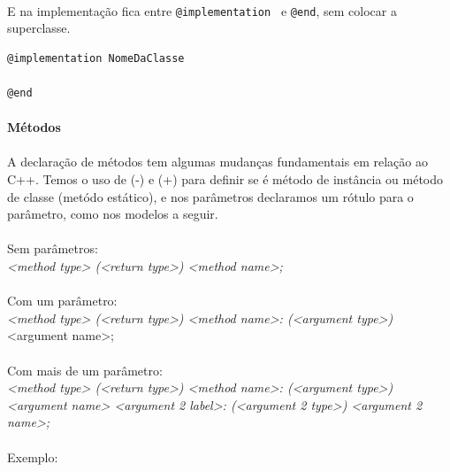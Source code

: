 \documentclass[a4paper,12pt,brazil,doubleside]{book}
\begin{document}
\paragraph{}E na implementação fica entre \texttt{@implementation
} e \texttt{@end}, sem colocar a superclasse.

\begin{listing}
\begin{verbatim}
@implementation NomeDaClasse

@end
\end{verbatim}
\end{listing}

\paragraph{}\textbf{Métodos}

\paragraph{}A declaração de métodos tem algumas mudanças fundamentais em relação ao C++. Temos o uso de (-) e (+) para definir se é método de instância ou método de classe (metódo estático), e nos parâmetros declaramos um rótulo para o parâmetro, como nos modelos a seguir.

\paragraph{}Sem parâmetros:\\
\emph{<method type> (<return type>) <method name>;}

\paragraph{}Com um parâmetro:\\
\emph{<method type> (<return type>) <method name>: (<argument type>)} <argument name>;

\paragraph{}Com mais de um parâmetro:\\
\emph{<method type> (<return type>) <method name>: (<argument type>) <argument name> <argument 2 label>: (<argument 2 type>) <argument 2 name>;}

\paragraph{}Exemplo:
\end{document}
